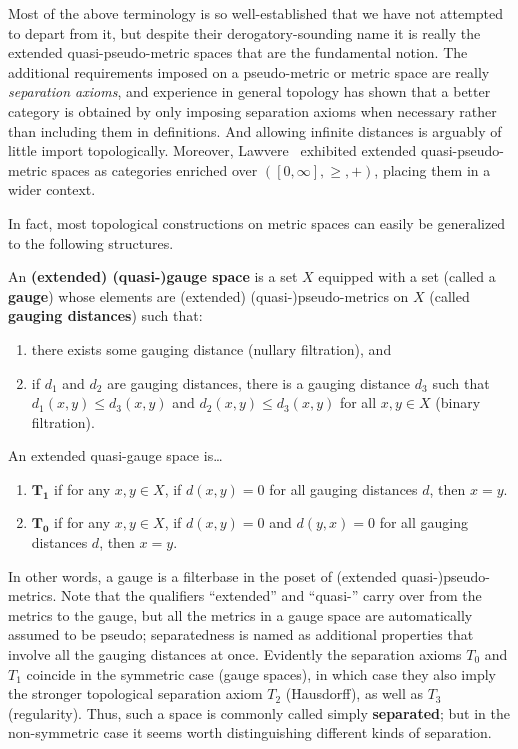 \documentclass{article}
\def\Rp{[0,\infty]}
\begin{document}
Most of the above terminology is so well-established that we have not attempted to depart from it, but despite their derogatory-sounding name it is really the extended quasi-pseudo-metric spaces that are the fundamental notion.
The additional requirements imposed on a pseudo-metric or metric space are really \emph{separation axioms}, and experience in general topology has shown that a better category is obtained by only imposing separation axioms when necessary rather than including them in definitions.
And allowing infinite distances is arguably of little import topologically.
Moreover, Lawvere~\cite{lawvere:metric-spaces} exhibited extended quasi-pseudo-metric spaces as categories enriched over $(\Rp,\ge,+)$, placing them in a wider context.

In fact, most topological constructions on metric spaces can easily be generalized to the following structures.

\begin{defn}
  An \textbf{(extended) (quasi-)gauge space} is a set $X$ equipped with a set (called a \textbf{gauge}) whose elements are (extended) (quasi-)pseudo-metrics on $X$ (called \textbf{gauging distances}) such that:
  \begin{enumerate}
  \item there exists some gauging distance (nullary filtration), and
  \item if $d_1$ and $d_2$ are gauging distances, there is a gauging distance $d_3$ such that $d_1(x,y)\le d_3(x,y)$ and $d_2(x,y)\le d_3(x,y)$ for all $x,y\in X$ (binary filtration).
  \end{enumerate}
  An extended quasi-gauge space is\dots
  \begin{enumerate}[resume]
  \item $\mathbf{T_1}$ if for any $x,y\in X$, if $d(x,y)=0$ for all gauging distances $d$, then $x=y$.
  \item $\mathbf{T_0}$ if for any $x,y\in X$, if $d(x,y)=0$ and $d(y,x)=0$ for all gauging distances $d$, then $x=y$.
  \end{enumerate}
\end{defn}

In other words, a gauge is a filterbase in the poset of (extended quasi-)pseudo-metrics.
Note that the qualifiers ``extended'' and ``quasi-'' carry over from the metrics to the gauge, but all the metrics in a gauge space are automatically assumed to be pseudo; separatedness is named as additional properties that involve all the gauging distances at once.
Evidently the separation axioms $T_0$ and $T_1$ coincide in the symmetric case (gauge spaces), in which case they also imply the stronger topological separation axiom $T_2$ (Hausdorff), as well as $T_3$ (regularity).
Thus, such a space is commonly called simply \textbf{separated}; but in the non-symmetric case it seems worth distinguishing different kinds of separation.
\end{document}
